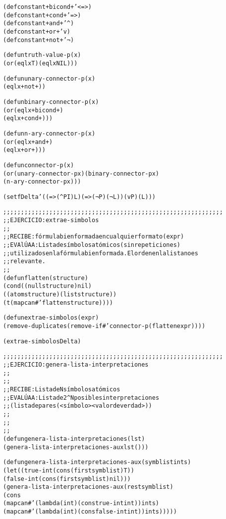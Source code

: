 \begin{aibox}{\code}

\begin{alltt}
(defconstant +bicond+ '<=>) 
(defconstant +cond+ '=>) 
(defconstant +and+ '^) 
(defconstant +or+ 'v) 
(defconstant +not+ '¬)

(defun truth-value-p (x)
    (or (eql x T) (eql x NIL)))

(defun unary-connector-p (x) 
    (eql x +not+))

(defun binary-connector-p (x) 
    (or (eql x +bicond+)
        (eql x +cond+)))

(defun n-ary-connector-p (x) 
    (or (eql x +and+)
        (eql x +or+)))

(defun connector-p (x)
    (or (unary-connector-p x) (binary-connector-p x)
        (n-ary-connector-p x)))

(setf Delta '((=> (^ P I) L) (=> (¬ P) (¬ L)) (v P) (L)))

;;;;;;;;;;;;;;;;;;;;;;;;;;;;;;;;;;;;;;;;;;;;;;;;;;;;;;;;;;;;;;
;; EJERCICIO: extrae-simbolos
;;
;; RECIBE : fórmula bien formada en cualquier formato (expr)
;; EVAlÚA A: Lista de símbolos atómicos (sin repeticiones)
;; utilizados en la fórmula bien formada. El orden en la lista no es
;; relevante.
;;
(defun flatten (structure)
    (cond ((null structure) nil)
        ((atom structure) (list structure))
        (t (mapcan #'flatten structure))))

(defun extrae-simbolos (expr)
    (remove-duplicates (remove-if #'connector-p (flatten expr))))

(extrae-simbolos Delta)

;;;;;;;;;;;;;;;;;;;;;;;;;;;;;;;;;;;;;;;;;;;;;;;;;;;;;;;;;;;;;;
;; EJERCICIO: genera-lista-interpretaciones
;;
;;
;; RECIBE   : Lista de N símbolos atómicos
;; EVALÚA A : Lista de 2^N posibles interpretaciones
;;             (lista de pares (<símbolo> <valor de verdad>))
;;
;;
;;
(defun genera-lista-interpretaciones (lst) 
    (genera-lista-interpretaciones-aux lst ()))

(defun genera-lista-interpretaciones-aux (symblist ints)
    (let ((true-int (cons (first symblist) T))
        (false-int (cons (first symblist) nil)))
    (genera-lista-interpretaciones-aux (rest symblist)
        (cons 
            (mapcan #'(lambda (int) (cons true-int int)) ints)
            (mapcan #'(lambda (int) (cons false-int int)) ints)))))

\end{alltt}
\end{aibox}
